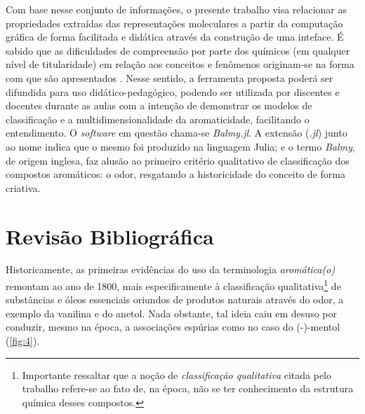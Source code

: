 Com base nesse conjunto de informações, o presente trabalho visa relacionar as propriedades extraídas das representações moleculares a partir da computação gráfica de forma facilitada e didática através da construção de uma inteface. É sabido que as dificuldades de compreensão por parte dos químicos (em qualquer nível de titularidade) em relação aos conceitos e fenômenos originam-se na forma com que são apresentados \autocite{Cunha2018}. Nesse sentido, a ferramenta proposta poderá ser difundida para uso didático-pedagógico, podendo ser utilizada por discentes e docentes durante as aulas com a intenção de demonstrar os modelos de classificação e a multidimensionalidade da aromaticidade, facilitando o entendimento. O \textit{software} em questão chama-se \textit{Balmy.jl}. A extensão (\textit{.jl}) junto ao nome indica que o mesmo foi produzido na linguagem Julia; e o termo \textit{Balmy}, de origem inglesa, faz alusão ao primeiro critério qualitativo de classificação dos compostos aromáticos: o odor, resgatando a historicidade do conceito de forma criativa.


\chapter{Revisão Bibliográfica}

Historicamente, as primeiras evidências do uso da terminologia \textit{aromática(o)} remontam ao ano de 1800, mais especificamente à classificação qualitativa\footnote{Importante ressaltar que a noção de \textit{classificação qualitativa} citada pelo trabalho refere-se ao fato de, na época, não se ter conhecimento da estrutura química desses compostos.} de substâncias e óleos essenciais oriundos de produtos naturais através do odor, a exemplo da vanilina e do anetol. Nada obstante, tal ideia caiu em desuso por conduzir, mesmo na época, a associações espúrias como no caso do (-)-mentol (\autoref{fig:4}).

